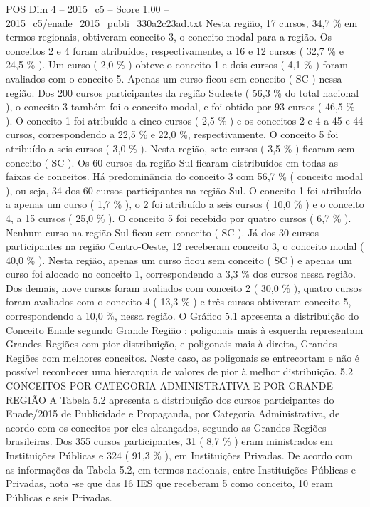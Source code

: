 \begin{textsample}{POS Dim 4 – 2015\_c5 – Score 1.00 – 2015\_c5/enade\_2015\_publi\_330a2c23ad.txt}
Nesta região, 17 cursos, 34,7 \% em termos regionais, obtiveram conceito 3, o conceito modal para a região.
Os conceitos 2 e 4 foram atribuídos, respectivamente, a 16 e 12 cursos ( 32,7 \% e 24,5 \% ).
Um curso ( 2,0 \% ) obteve o conceito 1 e dois cursos ( 4,1 \% ) foram avaliados com o conceito 5.
Apenas um curso ficou sem conceito ( SC ) nessa região.
Dos 200 cursos participantes da região Sudeste ( 56,3 \% do total nacional ), o conceito 3 também foi o conceito modal, e foi obtido por 93 cursos ( 46,5 \% ).
O conceito 1 foi atribuído a cinco cursos ( 2,5 \% ) e os conceitos 2 e 4 a 45 e 44 cursos, correspondendo a 22,5 \% e 22,0 \%, respectivamente.
O conceito 5 foi atribuído a seis cursos ( 3,0 \% ).
Nesta região, sete cursos ( 3,5 \% ) ficaram sem conceito ( SC ).
Os 60 cursos da região Sul ficaram distribuídos em todas as faixas de conceitos.
Há predominância do conceito 3 com 56,7 \% ( conceito modal ), ou seja, 34 dos 60 cursos participantes na região Sul.
O conceito 1 foi atribuído a apenas um curso ( 1,7 \% ), o 2 foi atribuído a seis cursos ( 10,0 \% ) e o conceito 4, a 15 cursos ( 25,0 \% ).
O conceito 5 foi recebido por quatro cursos ( 6,7 \% ).
Nenhum curso na região Sul ficou sem conceito ( SC ).
Já dos 30 cursos participantes na região Centro-Oeste, 12 receberam conceito 3, o conceito modal ( 40,0 \% ).
Nesta região, apenas um curso ficou sem conceito ( SC ) e apenas um curso foi alocado no conceito 1, correspondendo a 3,3 \% dos cursos nessa região.
Dos demais, nove cursos foram avaliados com conceito 2 ( 30,0 \% ), quatro cursos foram avaliados com o conceito 4 ( 13,3 \% ) e três cursos obtiveram conceito 5, correspondendo a 10,0 \%, nessa região.
O Gráfico 5.1 apresenta a distribuição do Conceito Enade segundo Grande Região : poligonais mais à esquerda representam Grandes Regiões com pior distribuição, e poligonais mais à direita, Grandes Regiões com melhores conceitos.
Neste caso, as poligonais se entrecortam e não é possível reconhecer uma hierarquia de valores de pior à melhor distribuição. 5.2 CONCEITOS POR CATEGORIA ADMINISTRATIVA E POR GRANDE REGIÃO A Tabela 5.2 apresenta a distribuição dos cursos participantes do Enade/2015 de Publicidade e Propaganda, por Categoria Administrativa, de acordo com os conceitos por eles alcançados, segundo as Grandes Regiões brasileiras.
Dos 355 cursos participantes, 31 ( 8,7 \% ) eram ministrados em Instituições Públicas e 324 ( 91,3 \% ), em Instituições Privadas.
De acordo com as informações da Tabela 5.2, em termos nacionais, entre Instituições Públicas e Privadas, nota -se que das 16 IES que receberam 5 como conceito, 10 eram Públicas e seis Privadas.

\end{textsample}
